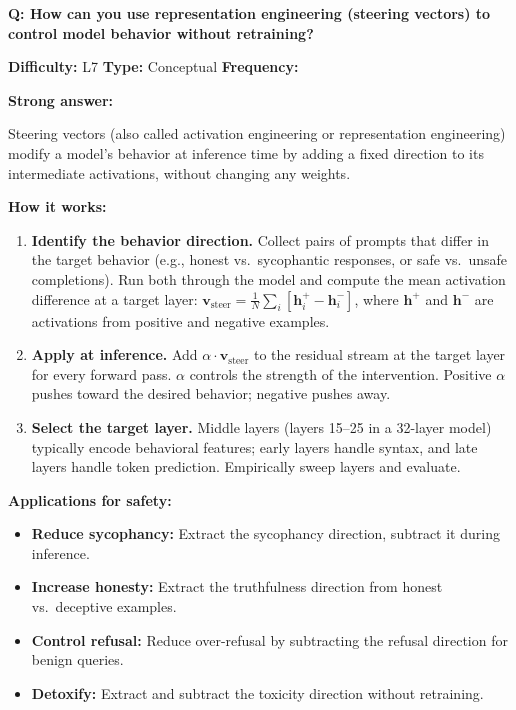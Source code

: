 
\begin{interviewq}
\textbf{Q: How can you use representation engineering (steering vectors) to control model behavior without retraining?}

\textbf{Difficulty:} L7 \quad \textbf{Type:} Conceptual \quad \textbf{Frequency:} \freqlow{}

\textbf{Strong answer:}

Steering vectors (also called activation engineering or representation engineering) modify a model's behavior at inference time by adding a fixed direction to its intermediate activations, without changing any weights.

\textbf{How it works:}
\begin{enumerate}
    \item \textbf{Identify the behavior direction.} Collect pairs of prompts that differ in the target behavior (e.g., honest vs.\ sycophantic responses, or safe vs.\ unsafe completions). Run both through the model and compute the mean activation difference at a target layer: $\mathbf{v}_{\text{steer}} = \frac{1}{N}\sum_i [\mathbf{h}_i^{+} - \mathbf{h}_i^{-}]$, where $\mathbf{h}^{+}$ and $\mathbf{h}^{-}$ are activations from positive and negative examples.
    \item \textbf{Apply at inference.} Add $\alpha \cdot \mathbf{v}_{\text{steer}}$ to the residual stream at the target layer for every forward pass. $\alpha$ controls the strength of the intervention. Positive $\alpha$ pushes toward the desired behavior; negative pushes away.
    \item \textbf{Select the target layer.} Middle layers (layers 15--25 in a 32-layer model) typically encode behavioral features; early layers handle syntax, and late layers handle token prediction. Empirically sweep layers and evaluate.
\end{enumerate}

\textbf{Applications for safety:}
\begin{itemize}
    \item \textbf{Reduce sycophancy:} Extract the sycophancy direction, subtract it during inference.
    \item \textbf{Increase honesty:} Extract the truthfulness direction from honest vs.\ deceptive examples.
    \item \textbf{Control refusal:} Reduce over-refusal by subtracting the refusal direction for benign queries.
    \item \textbf{Detoxify:} Extract and subtract the toxicity direction without retraining.
\end{itemize}


\end{interviewq}
